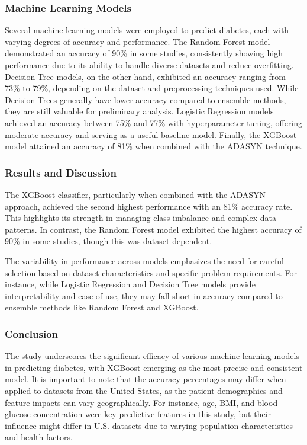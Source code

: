 \documentclass[conference]{IEEEtran}
\begin{document}
\subsubsection{Machine Learning Models}
Several machine learning models were employed to predict diabetes, each with varying degrees of accuracy and performance. The Random Forest model demonstrated an accuracy of 90\% in some studies, consistently showing high performance due to its ability to handle diverse datasets and reduce overfitting. Decision Tree models, on the other hand, exhibited an accuracy ranging from 73\% to 79\%, depending on the dataset and preprocessing techniques used. While Decision Trees generally have lower accuracy compared to ensemble methods, they are still valuable for preliminary analysis.
Logistic Regression models achieved an accuracy between 75\% and 77\% with hyperparameter tuning, offering moderate accuracy and serving as a useful baseline model. Finally, the XGBoost model attained an accuracy of 81\% when combined with the ADASYN technique. 


\subsubsection{Results and Discussion}
The XGBoost classifier, particularly when combined with the ADASYN approach, achieved the second highest performance with an 81\% accuracy rate. This highlights its strength in managing class imbalance and complex data patterns. In contrast, the Random Forest model exhibited the highest accuracy of 90\% in some studies, though this was dataset-dependent.

The variability in performance across models emphasizes the need for careful selection based on dataset characteristics and specific problem requirements. For instance, while Logistic Regression and Decision Tree models provide interpretability and ease of use, they may fall short in accuracy compared to ensemble methods like Random Forest and XGBoost.

\subsubsection{Conclusion}
The study underscores the significant efficacy of various machine learning models in predicting diabetes, with XGBoost emerging as the most precise and consistent model. It is important to note that the accuracy percentages may differ when applied to datasets from the United States, as the patient demographics and feature impacts can vary geographically. For instance, age, BMI, and blood glucose concentration were key predictive features in this study, but their influence might differ in U.S. datasets due to varying population characteristics and health factors.
\end{document}
